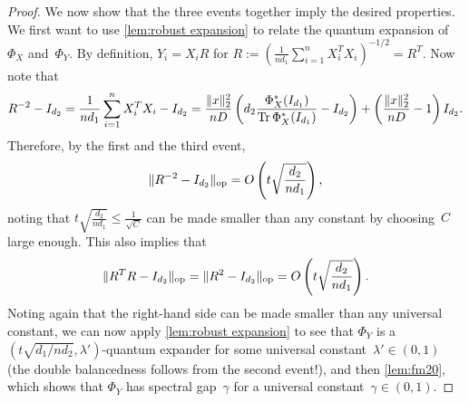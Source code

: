 \documentclass[aos]{imsart}
\theoremstyle{definition}
\numberwithin{equation}{section}
\DeclareMathOperator{\op}{op}
\DeclareMathOperator{\tr}{Tr}
\DeclarePairedDelimiter{\norm}{\lVert}{\rVert}
\begin{document}
\begin{proof}
We now show that the three events together imply the desired properties.
We first want to use \cref{lem:robust expansion} to relate the quantum expansion of~$\Phi_X$ and~$\Phi_Y$.
By definition, $Y_i = X_i R$ for $R := ( \frac1{nd_1} \sum_{i=1}^n X_i^T X_i )^{-1/2} = R^T$.
Now note that
\begin{align*}
  R^{-2} - I_{d_2}
= \frac1{nd_1} \sum_{i=1}^n X_i^T X_i - I_{d_2}
= \frac{\norm{x}_2^2}{nD} \left( d_2 \frac{\Phi_X^*(I_{d_1})}{\tr \Phi_X^*(I_{d_1})} - I_{d_2} \right)
+ \left( \frac{\norm{x}_2^2}{nD} - 1 \right) I_{d_2}.
\end{align*}
Therefore, by the first and the third event,
\begin{align*}
  \norm{R^{-2} - I_{d_2}}_{\op}
= O\left(t\sqrt{\frac{d_2}{nd_1}}\right),
\end{align*}
noting that $t\sqrt{\frac{d_2}{nd_1}} \leq \frac1{\sqrt C}$ can be made smaller than any constant by choosing~$C$ large enough.
This also implies that
\begin{align}\label{eq:RR bound}
  \norm{R^TR - I_{d_2}}_{\op}
= \norm{R^2 - I_{d_2}}_{\op}
= O\left(t\sqrt{\frac{d_2}{nd_1}}\right).
\end{align}
Noting again that the right-hand side can be made smaller than any universal constant, we can now apply \cref{lem:robust expansion} to see that $\Phi_Y$ is a $(t\sqrt{d_1/nd_2},\lambda')$-quantum expander for some universal constant~$\lambda'\in(0,1)$ (the double balancedness follows from the second event!), and then \cref{lem:fm20}, which shows that $\Phi_Y$ has spectral gap~$\gamma$ for a universal constant~$\gamma\in(0,1)$.


\end{proof}
\end{document}
